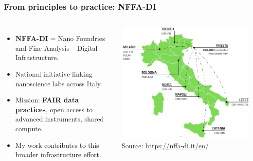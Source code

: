 \documentclass{beamer}
\begin{document}
	\begin{frame}
		\frametitle{From principles to practice: NFFA-DI}
		\begin{columns}[T,totalwidth=\textwidth]
			\begin{itemize}
				\item \textbf{NFFA-DI} = Nano Foundries and Fine Analysis – Digital Infrastructure.
				\item National initiative linking nanoscience labs across Italy.
				\item Mission: \textbf{FAIR data practices}, open access to advanced instruments, shared compute.
				\item My work contributes to this broader infrastructure effort.
			\end{itemize}
			\includegraphics[width=\linewidth]{otherResources/NFFA_map.png}
			\vspace{1em}
			\tiny Source: \url{https://nffa-di.it/en/}
		\end{columns}
	\end{frame}
	
\end{document}
